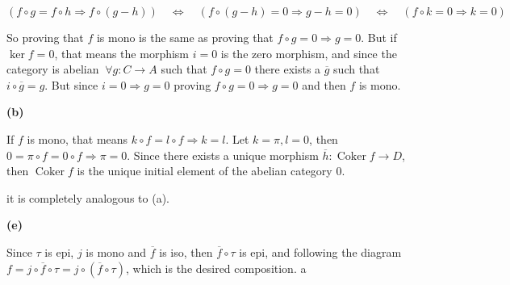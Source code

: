 \documentclass[leqno]{article}
\DeclareMathOperator{\coker}{Coker}
\begin{document}
\fbox{$\Leftarrow$}
\[
  (f\circ g = f\circ h \Rightarrow f\circ (g-h) ) \quad \iff \quad (f\circ (g-h)=0 \Rightarrow g-h=0 ) \quad \iff \quad (f\circ k =0 \Rightarrow k=0)
\] 

So proving that $f$ is mono is the same as proving that $f\circ g = 0 \Rightarrow g=0$. But if $\ker f = 0$, that means the morphism  $i=0$ is the zero morphism, and since the category is abelian  $\ \forall g:C\to A$ such that $f\circ g=0$ there exists a $\overline{g}$ such that $i\circ \overline{g}=g$. But since $i=0 \Rightarrow g=0$ proving $f\circ g =0 \Rightarrow g=0$ and then $f$ is mono.


\textbf{(b)}

\fbox{$\Rightarrow$} If $f$ is mono, that means  $k\circ f =l\circ f \Rightarrow k=l$. Let $k = \pi, l = 0$, then $0=\pi\circ f=0\circ f\Rightarrow \pi=0$. Since there exists a unique morphism $\overline{h}:\coker f\to D$, then $\coker f$ is the unique initial element of the abelian category $0$.

\fbox{$\Leftarrow$} it is completely analogous to (a).

\textbf{(e)} 

Since $\tau $ is epi, $j$ is mono and  $\overline{f}$ is iso, then $\overline{f}\circ \tau $ is epi, and following the diagram $f = j\circ \overline{f} \circ \tau  = j\circ (\overline{f}\circ \tau)$, which is the desired composition. a 
\end{document}

